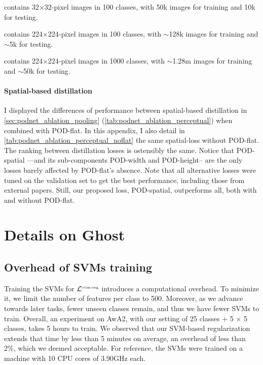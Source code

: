 {\begin{description} \setlength{\parskip}{0pt}
      \item[CIFAR100] contains 32$\times$32-pixel images in 100 classes, with 50k images for training
            and 10k for testing.
      \item[ImageNet100] contains 224$\times$224-pixel images in 100 classes, with $\sim$128k images
            for training and $\sim$5k for testing.
      \item[ImageNet1000] contains 224$\times$224-pixel images in 1000 classes, with $\sim$1.28m
            images for training and $\sim$50k for testing. \end{description}}

\paragraph{Spatial-based distillation} I displayed the differences of performance between
spatial-based distillation in \autoref{sec:podnet_ablation_pooling}
(\autoref{tab:podnet_ablation_perceptual}) when combined with POD-flat. In this appendix, I also
detail in \autoref{tab:podnet_ablation_perceptual_noflat} the same spatial-loss without POD-flat.
The ranking between distillation losses is ostensibly the same. Notice that POD-spatial ---and its
sub-components POD-width and POD-height-- are the only losses barely affected by POD-flat's absence.
Note that all alternative losses were tuned on the validation set to get the best performance,
including those from external papers. Still, our proposed loss, POD-spatial, outperforms all, both
with and without POD-flat.





\section{Details on Ghost}
\label{sec:appendix_ghost}


\subsection{Overhead of SVMs training}

Training the SVMs for $\mathcal{L}^{\text{\tiny{svm-reg}}}$ introduces a computational overhead. To
minimize it, we limit the number of features per class to 500. Moreover, as we advance towards later
tasks, fewer unseen classes remain, and thus we have fewer SVMs to train. Overall, an experiment on
AwA2, with our setting of 25 classes + 5 $\times$ 5 classes, takes 5 hours to train. We observed
that our SVM-based regularization extends that time by less than 5 minutes on average, an overhead
of less than 2\%, which we deemed acceptable. For reference, the SVMs were trained on a machine with
10 CPU cores of 3.90GHz each.

